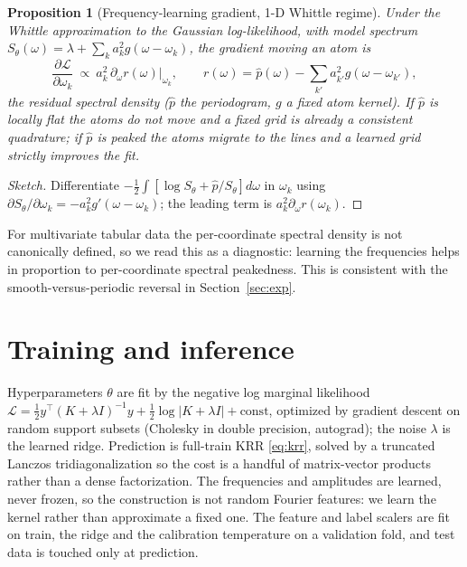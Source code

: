 \documentclass[11pt]{article}
\newtheorem{proposition}{Proposition}
\theoremstyle{definition}
\begin{document}
\begin{proposition}[Frequency-learning gradient, 1-D Whittle regime]\label{prop:freqlearn}
Under the Whittle approximation to the Gaussian log-likelihood, with model spectrum
$S_\theta(\omega)=\lambda+\sum_k a_k^2 g(\omega-\omega_k)$, the gradient moving an atom is
\begin{equation}
\frac{\partial\mathcal{L}}{\partial\omega_k}\ \propto\ a_k^2\,\partial_\omega r(\omega)\big|_{\omega_k},
\qquad r(\omega)=\hat p(\omega)-\textstyle\sum_{k'}a_{k'}^2g(\omega-\omega_{k'}),
\end{equation}
the residual spectral density ($\hat p$ the periodogram, $g$ a fixed atom kernel). If $\hat p$ is
locally flat the atoms do not move and a fixed grid is already a consistent quadrature; if $\hat p$
is peaked the atoms migrate to the lines and a learned grid strictly improves the fit.
\end{proposition}
\begin{proof}[Sketch]
Differentiate $-\tfrac12\int[\log S_\theta+\hat p/S_\theta]d\omega$ in $\omega_k$ using
$\partial S_\theta/\partial\omega_k=-a_k^2 g'(\omega-\omega_k)$; the leading term is
$a_k^2\partial_\omega r(\omega_k)$.
\end{proof}

For multivariate tabular data the per-coordinate spectral density is not canonically defined, so
we read this as a diagnostic: learning the frequencies helps in proportion to per-coordinate
spectral peakedness. This is consistent with the smooth-versus-periodic reversal in
Section~\ref{sec:exp}.

\section{Training and inference}\label{sec:decode}
Hyperparameters $\theta$ are fit by the negative log marginal likelihood
$\mathcal{L}=\tfrac12 y^\top(K+\lambda I)^{-1}y+\tfrac12\log\lvert K+\lambda I\rvert+\text{const}$,
optimized by gradient descent on random support subsets (Cholesky in double precision, autograd);
the noise $\lambda$ is the learned ridge. Prediction is full-train KRR \eqref{eq:krr}, solved by a
truncated Lanczos tridiagonalization \citep{lanczos1950} so the cost is a handful of matrix-vector
products rather than a dense factorization. The frequencies and amplitudes are learned, never
frozen, so the construction is not random Fourier features: we learn the kernel rather than
approximate a fixed one. The feature and label scalers are fit on train, the ridge and the
calibration temperature on a validation fold, and test data is touched only at prediction.
\end{document}
